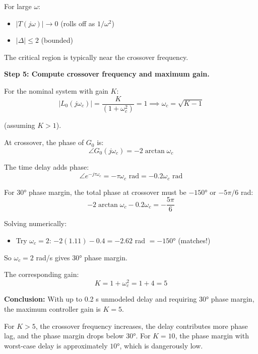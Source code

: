\begin{example}
For large $\omega$:
\begin{itemize}
    \item $|T(j\omega)| \to 0$ (rolls off as $1/\omega^2$)
    \item $|\Delta| \leq 2$ (bounded)
\end{itemize}

The critical region is typically near the crossover frequency.

\textbf{Step 5: Compute crossover frequency and maximum gain.}

For the nominal system with gain $K$:
\begin{equation}
|L_0(j\omega_c)| = \frac{K}{(1+\omega_c^2)} = 1 \implies \omega_c = \sqrt{K-1}
\end{equation}

(assuming $K > 1$).

At crossover, the phase of $G_0$ is:
\begin{equation}
\angle G_0(j\omega_c) = -2\arctan\omega_c
\end{equation}

The time delay adds phase:
\begin{equation}
\angle e^{-j\tau\omega_c} = -\tau\omega_c \text{ rad} = -0.2\omega_c \text{ rad}
\end{equation}

For 30° phase margin, the total phase at crossover must be $-150°$ or $-5\pi/6$ rad:
\begin{equation}
-2\arctan\omega_c - 0.2\omega_c = -\frac{5\pi}{6}
\end{equation}

Solving numerically:
\begin{itemize}
    \item Try $\omega_c = 2$: $-2(1.11) - 0.4 = -2.62$ rad $= -150°$ (matches!)
\end{itemize}

So $\omega_c = 2$ rad/s gives 30° phase margin.

The corresponding gain:
\begin{equation}
K = 1 + \omega_c^2 = 1 + 4 = 5
\end{equation}

\textbf{Conclusion:} With up to 0.2 s unmodeled delay and requiring 30° phase margin, the maximum controller gain is $K = 5$.

For $K > 5$, the crossover frequency increases, the delay contributes more phase lag, and the phase margin drops below 30°. For $K = 10$, the phase margin with worst-case delay is approximately $10°$, which is dangerously low.
\end{example}

